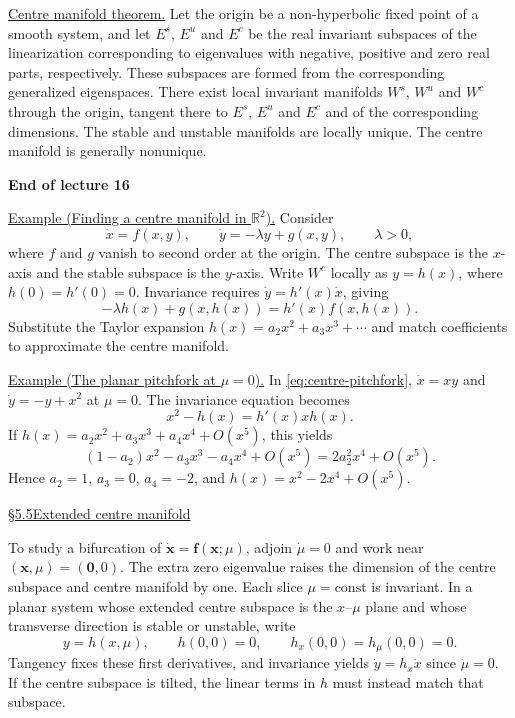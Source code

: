 \documentclass[11pt,a4paper]{article}
\begin{document}
\noindent\underline{Centre manifold theorem.}
Let the origin be a non-hyperbolic fixed point of a smooth system, and
let $E^s$, $E^u$ and $E^c$ be the real invariant subspaces of the
linearization corresponding to eigenvalues with negative, positive
and zero real parts, respectively. These subspaces are formed from
the corresponding generalized eigenspaces. There exist local invariant
manifolds $W^s$, $W^u$ and $W^c$ through the origin, tangent there to
$E^s$, $E^u$ and $E^c$ and of the corresponding dimensions.
The stable and unstable manifolds are locally unique. The centre
manifold is generally nonunique.
\begin{center}
\textbf{End of lecture 16}
\end{center}

\newpage
\noindent\underline{Example (Finding a centre manifold in $\mathbb R^2$).}
Consider
\[
\dot x=f(x,y),\qquad \dot y=-\lambda y+g(x,y),\qquad \lambda>0,
\]
where $f$ and $g$ vanish to second order at the origin. The centre
subspace is the $x$-axis and the stable subspace is the $y$-axis.
Write $W^c$ locally as $y=h(x)$, where $h(0)=h'(0)=0$. Invariance
requires $\dot y=h'(x)\dot x$, giving
\[
-\lambda h(x)+g(x,h(x))=h'(x)f(x,h(x)).
\]
Substitute the Taylor expansion $h(x)=a_2x^2+a_3x^3+\cdots$
and match coefficients to approximate the centre manifold.

\medskip
\noindent\underline{Example (The planar pitchfork at $\mu=0$).}
In \eqref{eq:centre-pitchfork}, $\dot x=xy$ and $\dot y=-y+x^2$
at $\mu=0$. The invariance equation becomes
\[
x^2-h(x)=h'(x)xh(x).
\]
If $h(x)=a_2x^2+a_3x^3+a_4x^4+O(x^5)$, this yields
\[
(1-a_2)x^2-a_3x^3-a_4x^4+O(x^5)=2a_2^2x^4+O(x^5).
\]
Hence $a_2=1$, $a_3=0$, $a_4=-2$, and
$h(x)=x^2-2x^4+O(x^5)$.

\medskip
\noindent\underline{\S 5.5\quad Extended centre manifold}

\medskip
\noindent To study a bifurcation of $\dot{\mathbf x}=\mathbf f(\mathbf x;\mu)$,
adjoin $\dot\mu=0$ and work near $(\mathbf x,\mu)=(\mathbf 0,0)$.
The extra zero eigenvalue raises the dimension of the centre subspace
and centre manifold by one. Each slice $\mu=\mathrm{const}$ is invariant.
In a planar system whose extended centre subspace is the $x$--$\mu$
plane and whose transverse direction is stable or unstable, write
\[
y=h(x,\mu),\qquad h(0,0)=0,\qquad h_x(0,0)=h_\mu(0,0)=0.
\]
Tangency fixes these first derivatives, and invariance yields
$\dot y=h_x\dot x$ since $\dot\mu=0$. If the centre subspace is
tilted, the linear terms in $h$ must instead match that subspace.
\end{document}
